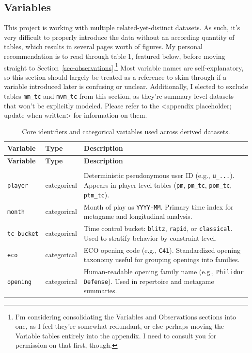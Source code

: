 \documentclass[
  12pt]{article}
\newcommand{\us}{\_\allowbreak}
\begin{document}
\subsection{Variables}\label{variables}

This project is working with multiple related-yet-distinct datasets. As
such, it's very difficult to properly introduce the data without an
according quantity of tables, which results in several pages worth of
figures. My personal recommendation is to read through table 1, featured
below, before moving straight to
Section~\ref{sec-observations}.\footnote{I'm considering consolidating
  the Variables and Observations sections into one, as I feel they're
  somewhat redundant, or else perhaps moving the Variable tables
  entirely into the appendix. I need to consult you for permission on
  that first, though.} Most variable names are self-explanatory, so this
section should largely be treated as a reference to skim through if a
variable introduced later is confusing or unclear. Additionally, I
elected to exclude tables \texttt{mm\_tc} and \texttt{mvm\_tc} from this
section, as they're summary-level datasets that won't be explicitly
modeled. Please refer to the \textless appendix placeholder; update when
written\textgreater{} for information on them.

\begin{xltabular}{\textwidth}{>{\raggedright\arraybackslash}p{3.2cm} >{\raggedright\arraybackslash}p{2.8cm} X}
\caption{Core identifiers and categorical variables used across derived datasets.}\label{tab:variables-core}\\
\toprule
\textbf{Variable} & \textbf{Type} & \textbf{Description} \\
\midrule
\endfirsthead

\toprule
\textbf{Variable} & \textbf{Type} & \textbf{Description} \\
\midrule
\endhead

\midrule
{} \\
\endfoot

\bottomrule
\endlastfoot

\texttt{player} & categorical & Deterministic pseudonymous user ID (e.g., \texttt{u\us ...}). Appears in player-level tables (\texttt{pm}, \texttt{pm\us tc}, \texttt{pom\us tc}, \texttt{ptm\us tc}). \\
\texttt{month} & categorical & Month of play as \texttt{YYYY-MM}. Primary time index for metagame and longitudinal analysis. \\
\texttt{tc\us bucket} & categorical & Time control bucket: \texttt{blitz}, \texttt{rapid}, or \texttt{classical}. Used to stratify behavior by constraint level. \\
\texttt{eco} & categorical & ECO opening code (e.g., \texttt{C41}). Standardized opening taxonomy useful for grouping openings into families. \\
\texttt{opening} & categorical & Human-readable opening family name (e.g., \texttt{Philidor Defense}). Used in repertoire and metagame summaries. \\
\end{xltabular}
\end{document}

